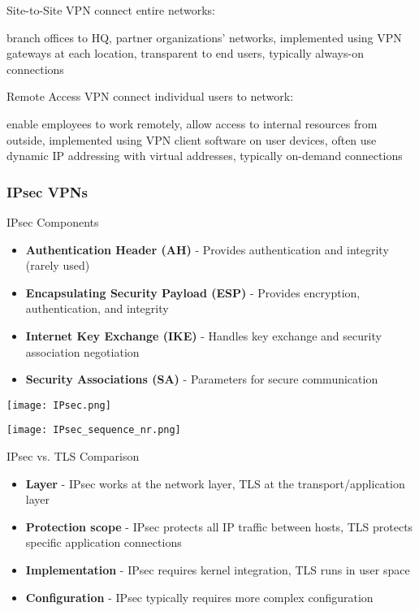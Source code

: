 \begin{concept}{Site-to-Site VPN}
connect entire networks:

branch offices to HQ, partner organizations' networks, implemented using VPN gateways at each location, transparent to end users, typically always-on connections
\end{concept}

\begin{concept}{Remote Access VPN}
connect individual users to network:

enable employees to work remotely, allow access to internal resources from outside, implemented using VPN client software on user devices, often use dynamic IP addressing with virtual addresses, typically on-demand connections
\end{concept}


\multend


\subsubsection{IPsec VPNs}



\begin{concept}{IPsec Components}
\begin{itemize}
    \item \textbf{Authentication Header (AH)} - Provides authentication and integrity (rarely used)
    \item \textbf{Encapsulating Security Payload (ESP)} - Provides encryption, authentication, and integrity
    \item \textbf{Internet Key Exchange (IKE)} - Handles key exchange and security association negotiation
    \item \textbf{Security Associations (SA)} - Parameters for secure communication
\end{itemize}
\texttt{[image: IPsec.png]}

\texttt{[image: IPsec\_sequence\_nr.png]}
\end{concept}

\begin{theorem}{IPsec vs. TLS Comparison}
\begin{itemize}
    \item \textbf{Layer} - IPsec works at the network layer, TLS at the transport/application layer
    \item \textbf{Protection scope} - IPsec protects all IP traffic between hosts, TLS protects specific application connections
    \item \textbf{Implementation} - IPsec requires kernel integration, TLS runs in user space
    \item \textbf{Configuration} - IPsec typically requires more complex configuration
\end{itemize}
\end{theorem}

